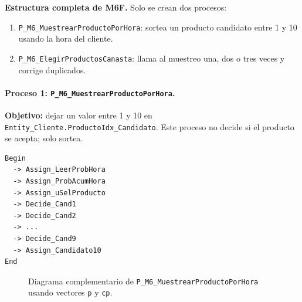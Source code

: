 \documentclass[11pt]{article}
\newcommand{\state}[1]{\texttt{#1}}
\newcommand{\proc}[1]{\texttt{#1}}
\begin{document}
\textbf{Estructura completa de M6F.} Solo se crean dos procesos:

\begin{enumerate}
  \item \proc{P\_M6\_MuestrearProductoPorHora}: sortea un producto candidato entre 1 y 10 usando la hora del cliente.
  \item \proc{P\_M6\_ElegirProductosCanasta}: llama al muestreo una, dos o tres veces y corrige duplicados.
\end{enumerate}

\paragraph{Proceso 1: \proc{P\_M6\_MuestrearProductoPorHora}.}
\textbf{Objetivo:} dejar un valor entre 1 y 10 en \state{Entity\_Cliente.ProductoIdx\_Candidato}. Este proceso no decide si el producto se acepta; solo sortea.

\begin{lstlisting}[caption={Diagrama corto de P M6 MuestrearProductoPorHora}]
Begin
  -> Assign_LeerProbHora
  -> Assign_ProbAcumHora
  -> Assign_uSelProducto
  -> Decide_Cand1
  -> Decide_Cand2
  -> ...
  -> Decide_Cand9
  -> Assign_Candidato10
End
\end{lstlisting}

\begin{figure}[H]
\centering
{}
\caption{Diagrama complementario de \proc{P\_M6\_MuestrearProductoPorHora} usando vectores \state{p} y \state{cp}.}
\end{figure}
\end{document}
